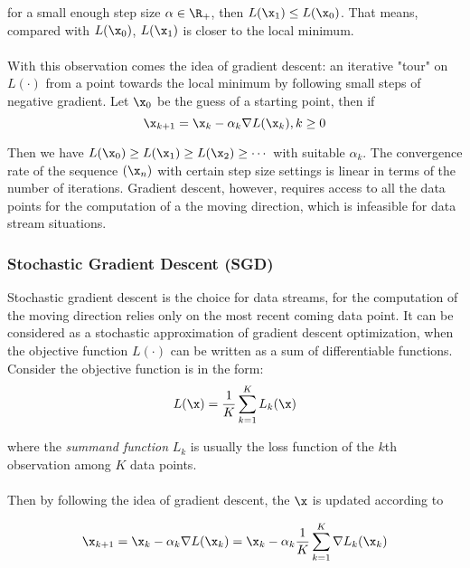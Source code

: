         for a small enough step size $\alpha \in \R_{+}$, then $L(\x_1) \leq L(\x_0)$. 
        That means, compared with $L(\x_0)$, $L(\x_1)$ is closer to the local minimum.
        \\\\
        With this observation comes the idea of gradient descent: an iterative "tour" on $L(\cdot)$ from a point towards the 
        local minimum by following small steps of negative gradient. 
        Let $\x_0$ be the guess of a starting point, then if
        \begin{equation}
            \x_{k+1} = \x_{k} - \alpha_k \nabla L(\x_k), k \geq 0
        \end{equation}
        
        
        Then we have $ L(\x_0) \geq L(\x_1) \geq L(\x_2) \geq \cdots$ with suitable $\alpha_k$. The convergence rate of the 
        sequence $(\x_n)$ with certain step size settings is linear in terms of the number of iterations.
        Gradient descent, however, requires access to all the data points for the computation of a the moving direction, which is infeasible for data stream situations.


    \subsubsection{Stochastic Gradient Descent (SGD)}
        Stochastic gradient descent is the choice for data streams, for the computation of the moving direction relies only on the most recent coming data point.
        It can be considered as a stochastic approximation of gradient descent optimization, 
        when the objective function $L(\cdot)$ can be written as a sum of differentiable functions.
        Consider the objective function is in the form:
        \begin{equation}
            L(\x) =\frac{1}{K} \sum_{k=1}^{K} L_k (\x)
        \end{equation}

        where the \textit{summand function} $L_k$ is usually the loss function of the $k$th observation among
        $K$ data points.
        \\\\
        Then by following the idea of gradient descent, the $\x$ is updated according to
        
        \begin{equation}
           \x_{k+1} = \x_{k} -\alpha_k \nabla L(\x_k) = \x_{k} -\alpha_k \frac{1}{K}\sum_{k=1}^{K} \nabla L_k(\x_k) 
        \end{equation}
        
